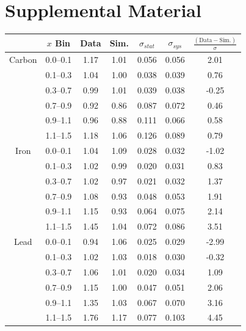 \documentclass[aps,preprint,showpacs,superscriptaddress]{revtex4} %
\newcommand{\Xbj}{\ensuremath{x}\xspace}
\begin{document}
\section{Supplemental Material}
%


\begin{table}[!ht]
  \begin{center}
    \begin{tabular}{ccccccc}
      \hline\hline
      & \Xbj Bin & Data & Sim. & $\sigma_{stat}$ & $\sigma_{sys}$ & $\frac{(\text{Data}-\text{Sim.})}{\sigma}$ \\ 

      \hline
      Carbon & 0.0--0.1 & 1.17 & 1.01 & 0.056 & 0.056 & 2.01 \\ 
       & 0.1--0.3 & 1.04 & 1.00 & 0.038 & 0.039 & 0.76 \\ 
       & 0.3--0.7 & 0.99 & 1.01 & 0.039 & 0.038 & -0.25 \\ 
       & 0.7--0.9 & 0.92 & 0.86 & 0.087 & 0.072 & 0.46 \\ 
       & 0.9--1.1 & 0.96 & 0.88 & 0.111 & 0.066 & 0.58 \\ 
       & 1.1--1.5 & 1.18 & 1.06 & 0.126 & 0.089 & 0.79 \\ 

      \hline
      Iron & 0.0--0.1 & 1.04 & 1.09 & 0.028 & 0.032 & -1.02 \\ 
       & 0.1--0.3 & 1.02 & 0.99 & 0.020 & 0.031 & 0.83 \\ 
       & 0.3--0.7 & 1.02 & 0.97 & 0.021 & 0.032 & 1.37 \\ 
       & 0.7--0.9 & 1.08 & 0.93 & 0.048 & 0.053 & 1.91 \\ 
       & 0.9--1.1 & 1.15 & 0.93 & 0.064 & 0.075 & 2.14 \\ 
       & 1.1--1.5 & 1.45 & 1.04 & 0.072 & 0.086 & 3.51 \\ 

      \hline
      Lead & 0.0--0.1 & 0.94 & 1.06 & 0.025 & 0.029 & -2.99 \\ 
       & 0.1--0.3 & 1.02 & 1.03 & 0.018 & 0.030 & -0.32 \\ 
       & 0.3--0.7 & 1.06 & 1.01 & 0.020 & 0.034 & 1.09 \\ 
       & 0.7--0.9 & 1.15 & 1.00 & 0.047 & 0.051 & 2.06 \\ 
       & 0.9--1.1 & 1.35 & 1.03 & 0.067 & 0.070 & 3.16 \\ 
       & 1.1--1.5 & 1.76 & 1.17 & 0.077 & 0.103 & 4.45 \\ 


\end{tabular}
\end{center}
\end{table}
\end{document}
